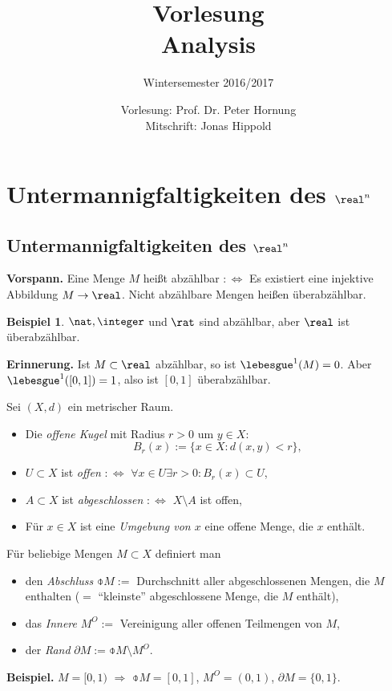 \documentclass[
 a4paper,
 12pt,
 parskip=half
 ]{scrartcl}
\title{Vorlesung\\Analysis}
\subtitle{Wintersemester 2016/2017}
\author{Vorlesung: Prof. Dr. Peter Hornung\\Mitschrift: Jonas Hippold}
\theoremstyle{plain}
\theoremstyle{definition}
\newtheorem*{exmp}{Beispiel}
\numberwithin{equation}{section}
\begin{document}
\maketitle

\tableofcontents

\clearpage



\clearpage

\section{Untermannigfaltigkeiten des \texorpdfstring{$\real^n$}{IRn}}

\subsection{Untermannigfaltigkeiten des \texorpdfstring{$\real^n$}{IRn}}
\textbf{Vorspann.} Eine Menge $M$ heißt abzählbar $:\Leftrightarrow$ Es existiert eine injektive Abbildung $M \to \real$. Nicht abzählbare Mengen heißen überabzählbar.

\begin{exmp}
 $\nat, \integer$ und $\rat$ sind abzählbar, aber $\real$ ist überabzählbar.
\end{exmp}

\textbf{Erinnerung.} Ist $M \subset \real$ abzählbar, so ist $\lebesgue^1(M) = 0$. Aber $\lebesgue^1( [0,1] ) = 1$, also ist $[0,1]$ überabzählbar.

Sei $(X,d)$ ein metrischer Raum. 
\begin{itemize}
 \item Die \emph{offene Kugel} mit Radius $r > 0$ um $y \in X$:
  \[ B_r(x) := \{ x \in X : d(x,y) < r \}, \]
 \item $U \subset X$ ist \emph{offen} $:\Leftrightarrow$ $\forall x \in U \exists r > 0 : B_r(x) \subset U$,
 \item $A \subset X$ ist \emph{abgeschlossen} $:\Leftrightarrow$ $X \setminus A$ ist offen,
 \item Für $x \in X$ ist eine \emph{Umgebung von $x$} eine offene Menge, die $x$ enthält.
\end{itemize}

Für beliebige Mengen $M \subset X$ definiert man 
\begin{itemize}
 \item den \emph{Abschluss} $\obar{M} :=$ Durchschnitt aller abgeschlossenen Mengen, die $M$ enthalten ($=$ ``kleinste'' abgeschlossene Menge, die $M$ enthält),
 \item das \emph{Innere} $M^O :=$ Vereinigung aller offenen Teilmengen von $M$, 
 \item der \emph{Rand} $\partial M := \obar{M} \setminus M^O$.
\end{itemize}
\textbf{Beispiel.} $M = [0,1)$ $\Rightarrow$ $\obar{M} = [0,1]$, $M^O = (0,1)$, $\partial M = \{ 0, 1 \}$.
\end{document}
